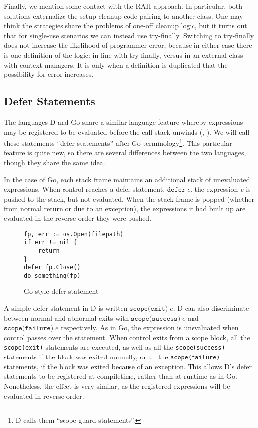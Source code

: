 \documentclass[11pt]{article}
\newcommand{\maybePage}{\newpage}
\begin{document}
Finally, we mention some contact with the RAII approach.
In particular, both solutions externalize the setup-cleanup code pairing to another class.
One may think the strategies share the problems of one-off cleanup logic, but it turns out that for single-use scenarios we can instead use try-finally.
Switching to try-finally does not increase the likelihood of programmer error, because in either case there is one definition of the logic: in-line with try-finally, versus in an external class with context managers.
It is only when a definition is duplicated that the possibility for error increases.


\maybePage
\subsection{Defer Statements}
\label{defer}

The languages D and Go share a similar language feature whereby expressions may be registered to be evaluated before the call stack unwinds (\cite{DReference}, \cite{GoLanguage}). We will call these statements ``defer statements'' after Go terminology\footnote{D calls them ``scope guard statements''.}. This particular feature is quite new, so there are several differences between the two languages, though they share the same idea.

In the case of Go, each stack frame maintains an additional stack of unevaluated expressions. When control reaches a defer statement, $\texttt{defer}\;e$, the expression \textit{e} is pushed to the stack, but not evaluated. When the stack frame is popped (whether from normal return or due to an exception), the expressions it had built up are evaluated in the reverse order they were pushed.

\begin{figure}[H]
\caption{Go-style defer statement}
\label{goDeferStatement}
\begin{verbatim}
fp, err := os.Open(filepath)
if err != nil {
    return
}
defer fp.Close()
do_something(fp)
\end{verbatim}
\end{figure}

A simple defer statement in D is written $\texttt{scope(exit)}\;e$.
D can also discriminate between normal and abnormal exits with $\texttt{scope(success)}\;e$ and $\texttt{scope(failure)}\;e$ respectively.
As in Go, the expression is unevaluated when control passes over the statement.
When control exits from a scope block, all the \texttt{scope(exit)} statements are executed, as well as all the \texttt{scope(success)} statements if the block was exited normally, or all the \texttt{scope(failure)} statements, if the block was exited because of an exception.
This allows D's defer statements to be registered at compiletime, rather than at runtime as in Go.
Nonetheless, the effect is very similar, as the registered expressions will be evaluated in reverse order.
\end{document}
